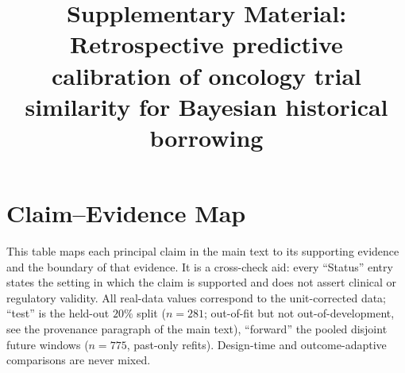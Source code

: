 \documentclass[11pt]{article}
\title{Supplementary Material:\\
Retrospective predictive calibration of oncology trial similarity
for Bayesian historical borrowing}
\author{}
\date{}
\begin{document}
\maketitle

\renewcommand{\thesection}{S\arabic{section}}
\renewcommand{\thetable}{S\arabic{table}}

\section{Claim--Evidence Map}

This table maps each principal claim in the main text to its supporting
evidence and the boundary of that evidence. It is a cross-check aid: every
``Status'' entry states the setting in which the claim is supported and does
not assert clinical or regulatory validity. All real-data values correspond to
the unit-corrected data; ``test'' is the held-out $20\%$ split ($n=281$;
out-of-fit but not out-of-development, see the provenance paragraph of the
main text), ``forward'' the pooled disjoint future windows ($n=775$,
past-only refits). Design-time and outcome-adaptive comparisons are never
mixed.
\end{document}
